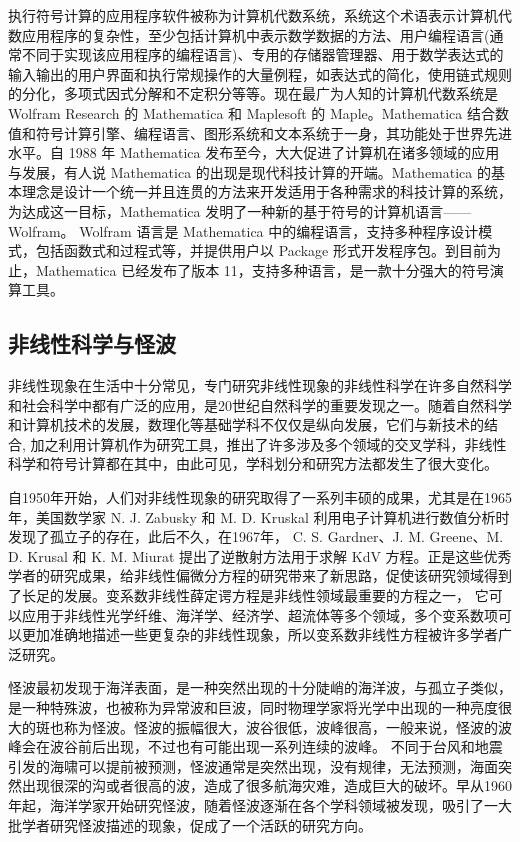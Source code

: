 执行符号计算的应用程序软件被称为计算机代数系统，系统这个术语表示计算机代数应用程序的复杂性，至少包括计算机中表示数学数据的方法、用户编程语言(通常不同于实现该应用程序的编程语言)、专用的存储器管理器、用于数学表达式的输入输出的用户界面和执行常规操作的大量例程，如表达式的简化，使用链式规则的分化，多项式因式分解和不定积分等等。现在最广为人知的计算机代数系统是 Wolfram Research 的 Mathematica 和 Maplesoft 的 Maple。Mathematica 结合数值和符号计算引擎、编程语言、图形系统和文本系统于一身，其功能处于世界先进水平。自 1988 年 Mathematica 发布至今，大大促进了计算机在诸多领域的应用与发展，有人说 Mathematica 的出现是现代科技计算的开端。Mathematica 的基本理念是设计一个统一并且连贯的方法来开发适用于各种需求的科技计算的系统，为达成这一目标，Mathematica 发明了一种新的基于符号的计算机语言——Wolfram。
Wolfram 语言是 Mathematica 中的编程语言，支持多种程序设计模式，包括函数式和过程式等，并提供用户以 Package 形式开发程序包。到目前为止，Mathematica 已经发布了版本 11，支持多种语言，是一款十分强大的符号演算工具。

\subsection{非线性科学与怪波}
非线性现象在生活中十分常见，专门研究非线性现象的非线性科学在许多自然科学和社会科学中都有广泛的应用，是20世纪自然科学的重要发现之一。随着自然科学和计算机技术的发展，数理化等基础学科不仅仅是纵向发展，它们与新技术的结合, 加之利用计算机作为研究工具，推出了许多涉及多个领域的交叉学科，非线性科学和符号计算都在其中，由此可见，学科划分和研究方法都发生了很大变化。

自1950年开始，人们对非线性现象的研究取得了一系列丰硕的成果，尤其是在1965年，美国数学家 N. J. Zabusky 和 M. D. Kruskal 利用电子计算机进行数值分析时发现了孤立子的存在，此后不久，在1967年， C. S. Gardner、J. M. Greene、M. D. Krusal 和 K. M. Miurat 提出了逆散射方法用于求解 KdV 方程。正是这些优秀学者的研究成果，给非线性偏微分方程的研究带来了新思路，促使该研究领域得到了长足的发展。变系数非线性薛定谔方程是非线性领域最重要的方程之一， 它可以应用于非线性光学纤维、海洋学、经济学、超流体等多个领域，多个变系数项可以更加准确地描述一些更复杂的非线性现象，所以变系数非线性方程被许多学者广泛研究。

怪波最初发现于海洋表面，是一种突然出现的十分陡峭的海洋波，与孤立子类似，是一种特殊波，也被称为异常波和巨波，同时物理学家将光学中出现的一种亮度很大的斑也称为怪波。怪波的振幅很大，波谷很低，波峰很高，一般来说，怪波的波峰会在波谷前后出现，不过也有可能出现一系列连续的波峰。
不同于台风和地震引发的海啸可以提前被预测，怪波通常是突然出现，没有规律，无法预测，海面突然出现很深的沟或者很高的波，造成了很多航海灾难，造成巨大的破坏。早从1960年起，海洋学家开始研究怪波，随着怪波逐渐在各个学科领域被发现，吸引了一大批学者研究怪波描述的现象，促成了一个活跃的研究方向。

